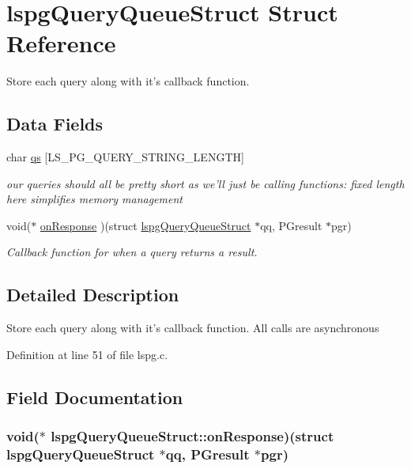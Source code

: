 \hypertarget{structlspgQueryQueueStruct}{
\section{lspgQueryQueueStruct Struct Reference}
\label{structlspgQueryQueueStruct}
}


Store each query along with it's callback function.  
\subsection*{Data Fields}
\begin{DoxyCompactItemize}
\item 
char \hyperlink{structlspgQueryQueueStruct_abf8c9c581b38a5e3e269eda69e47de15}{qs} \mbox{[}LS\_\-PG\_\-QUERY\_\-STRING\_\-LENGTH\mbox{]}
\begin{DoxyCompactList}\small\item\em our queries should all be pretty short as we'll just be calling functions: fixed length here simplifies memory management \item\end{DoxyCompactList}\item 
void($\ast$ \hyperlink{structlspgQueryQueueStruct_a53bac5ae4cab775423940bff5092a831}{onResponse} )(struct \hyperlink{structlspgQueryQueueStruct}{lspgQueryQueueStruct} $\ast$qq, PGresult $\ast$pgr)
\begin{DoxyCompactList}\small\item\em Callback function for when a query returns a result. \item\end{DoxyCompactList}\end{DoxyCompactItemize}


\subsection{Detailed Description}
Store each query along with it's callback function. All calls are asynchronous 

Definition at line 51 of file lspg.c.

\subsection{Field Documentation}
\hypertarget{structlspgQueryQueueStruct_a53bac5ae4cab775423940bff5092a831}{
\subsubsection[{onResponse}]{\setlength{\rightskip}{0pt plus 5cm}void($\ast$ {\bf lspgQueryQueueStruct::onResponse})(struct {\bf lspgQueryQueueStruct} $\ast$qq, PGresult $\ast$pgr)}}
\label{structlspgQueryQueueStruct_a53bac5ae4cab775423940bff5092a831}


